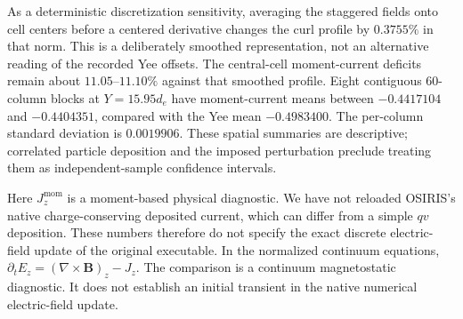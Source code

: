 As a deterministic discretization sensitivity, averaging the staggered fields
onto cell centers before a centered derivative changes the curl profile by
$0.3755\%$ in that norm. This is a deliberately smoothed representation,
not an alternative reading of the recorded Yee offsets. The central-cell
moment-current deficits remain about $11.05$--$11.10\%$ against that smoothed
profile. Eight contiguous 60-column blocks at $Y=15.95d_e$ have moment-current
means between $-0.4417104$ and $-0.4404351$, compared with the Yee mean
$-0.4983400$. The per-column standard deviation is $0.0019906$.
These spatial summaries are descriptive; correlated particle deposition and
the imposed perturbation preclude treating them as independent-sample
confidence intervals.

Here $J_z^{\mathrm{mom}}$ is a moment-based physical diagnostic. We have not
reloaded OSIRIS's native charge-conserving deposited current, which can differ
from a simple $qv$ deposition. These numbers therefore do not specify the
exact discrete electric-field update of the original executable.
In the normalized continuum equations,
$\partial_t E_z=(\nabla\times\mathbf B)_z-J_z$.
The comparison is a continuum magnetostatic diagnostic. It does not establish
an initial transient in the native numerical electric-field update.

